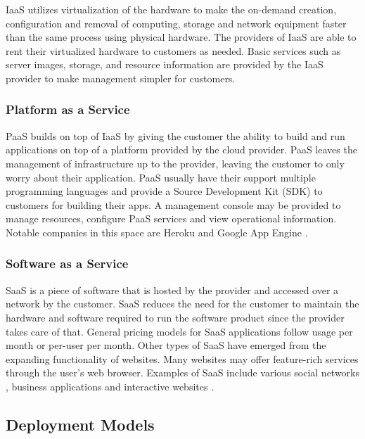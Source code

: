 \documentclass[12pt]{article}
\begin{document}
IaaS utilizes virtualization of the hardware to make the on-demand creation, configuration and removal of computing, storage and network equipment faster than the same process using physical hardware. The providers of IaaS are able to rent their virtualized hardware to customers as needed. Basic services such as server images, storage, and resource information are provided by the IaaS provider to make management simpler for customers.

\subsubsection{Platform as a Service} \label{ssub:paas}

PaaS builds on top of IaaS by giving the customer the ability to build and run applications on top of a platform provided by the cloud provider. PaaS leaves the management of infrastructure up to the provider, leaving the customer to only worry about their application. PaaS usually have their support multiple programming languages and provide a Source Development Kit (SDK) to customers for building their apps. A management console may be provided to manage resources, configure PaaS services and view operational information. Notable companies in this space are Heroku \cite{heroku} and Google App Engine \cite{googleappengine}.

\subsubsection{Software as a Service} \label{ssub:saas}

SaaS is a piece of software that is hosted by the provider and accessed over a network by the customer. SaaS reduces the need for the customer to maintain the hardware and software required to run the software product since the provider takes care of that. General pricing models for SaaS applications follow usage per month or per-user per month. Other types of SaaS have emerged from the expanding functionality of websites. Many websites may offer feature-rich services through the user's web browser. Examples of SaaS include various social networks \cite{facebook}, business applications \cite{salesforce} and interactive websites \cite{netflix}.



\subsection{Deployment Models} \label{sub:deployment-model}
\end{document}
